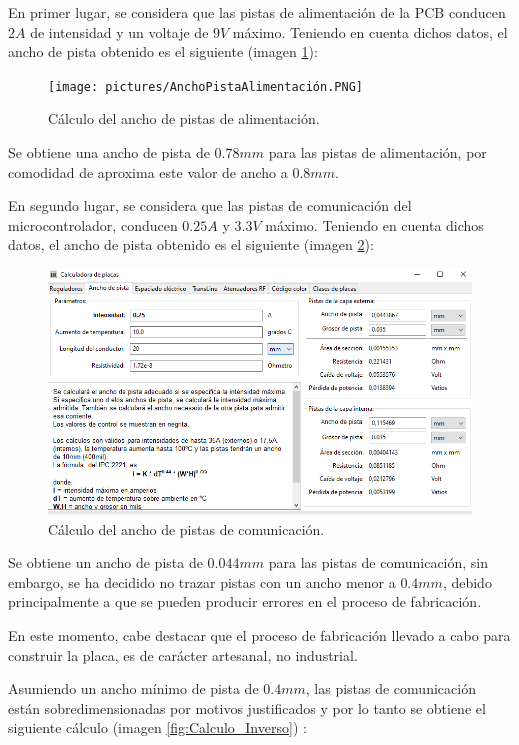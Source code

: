 En primer lugar, se considera que las pistas de alimentación de la \ac{PCB} conducen $2A$ de intensidad y un voltaje de $9V$ máximo. Teniendo en cuenta dichos datos, el ancho de pista obtenido es el siguiente (imagen \ref{fig:Ancho_Alimentacion}):

\begin{figure}[H]
\centering 
\texttt{[image: pictures/AnchoPistaAlimentación.PNG]}
\caption{Cálculo del ancho de pistas de alimentación.}
\label{fig:Ancho_Alimentacion}
\end{figure}
 
 Se obtiene una ancho de pista de $0.78mm$ para las pistas de alimentación, por comodidad de aproxima este valor de ancho a $0.8mm$.
 
 En segundo lugar, se considera que las pistas de comunicación del microcontrolador, conducen $0.25A$ y $3.3V$ máximo. Teniendo en cuenta dichos datos, el ancho de pista obtenido es el siguiente (imagen \ref{fig:Ancho_Comunicacion}):
 
\begin{figure}[H]
\centering 
\includegraphics[width=0.9\linewidth]{pictures/AnchoPistaRestoMinimo.PNG}
\caption{Cálculo del ancho de pistas de comunicación.}
\label{fig:Ancho_Comunicacion}
\end{figure}

Se obtiene un ancho de pista de $0.044mm$ para las pistas de comunicación, sin embargo, se ha decidido no trazar pistas con un ancho menor a $0.4mm$, debido principalmente a que se pueden producir errores en el proceso de fabricación.

En este momento, cabe destacar que el proceso de fabricación llevado a cabo para construir la placa, es de carácter artesanal, no industrial.

Asumiendo un ancho mínimo de pista de $0.4mm$, las pistas de comunicación están sobredimensionadas por motivos justificados y por lo tanto se obtiene el siguiente cálculo (imagen \ref{fig:Calculo_Inverso}) :

